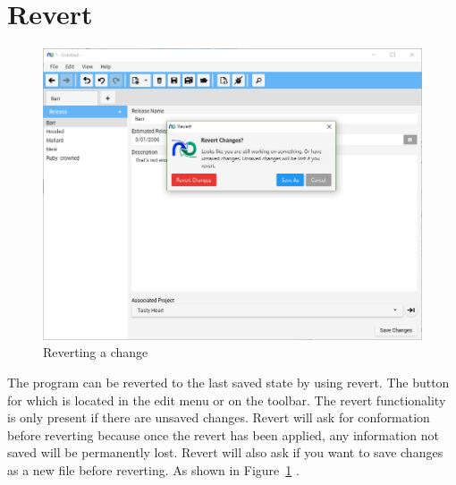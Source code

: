 \section{Revert}

\begin{figure}[h]
	\centering
	\includegraphics[width=\textwidth]{images/screenshots/revert1.PNG}
	\caption{Reverting a change}
	\label{fig:revert_revert}
\end{figure}

The program can be reverted to the last saved state by using revert. The button for which is located in the edit menu or on the toolbar.
The revert functionality is only present if there are unsaved changes.
Revert will ask for conformation before reverting because once the revert has been applied, any information not saved will be permanently lost.
Revert will also ask if you want to save changes as a new file before reverting. As shown in Figure~\ref{fig:revert_revert} .